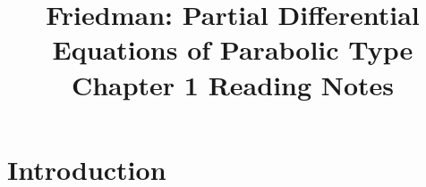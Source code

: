 \documentclass[11pt]{article}
\title{Friedman: Partial Differential Equations of Parabolic Type\\Chapter 1 Reading Notes}
\date{}
\begin{document}
\maketitle

\section{Introduction}

\begin{definition}
    
\end{definition}
\end{document}
